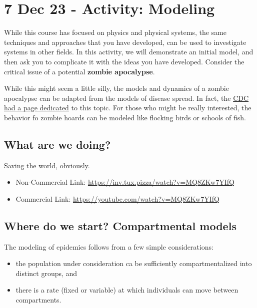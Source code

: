 \section{7 Dec 23 - Activity:
Modeling}\label{dec-23---activity-modeling}

While this course has focused on physics and physical systems, the same
techniques and approaches that you have developed, can be used to
investigate systems in other fields. In this activity, we will
demonstrate an initial model, and then ask you to complicate it with the
ideas you have developed. Consider the critical issue of a potential
\textbf{zombie apocalypse}.

While this might seem a little silly, the models and dynamics of a
zombie apocalypse can be adapted from the models of disease spread. In
fact, the
\href{https://www.usatoday.com/story/news/nation/2021/03/05/zombie-apocalypse-cdc-useful-advice-any-emergency-pandemic/6920614002/}{CDC
had a page dedicated} to this topic. For those who might be really
interested, the behavior fo zombie hoards can be modeled like flocking
birds or schools of fish.

\subsection{What are we doing?}\label{what-are-we-doing}

Saving the world, obviously.

\href{https://inv.tux.pizza/watch?v=MQ8ZKw7YIfQ}{\pandocbounded{\texttt{[image: https://markdown-videos-api.jorgenkh.no/youtube/MQ8ZKw7YIfQ?width=720\&height=405]}}}

\begin{itemize}
\tightlist
\item
  Non-Commercial Link: \url{https://inv.tux.pizza/watch?v=MQ8ZKw7YIfQ}
\item
  Commercial Link: \url{https://youtube.com/watch?v=MQ8ZKw7YIfQ}
\end{itemize}

\subsection{Where do we start? Compartmental
models}\label{where-do-we-start-compartmental-models}

The modeling of epidemics follows from a few simple considerations:

\begin{itemize}
\tightlist
\item
  the population under consideration ca be sufficiently
  compartmentalized into distinct groups, and
\item
  there is a rate (fixed or variable) at which individuals can move
  between compartments.
\end{itemize}

